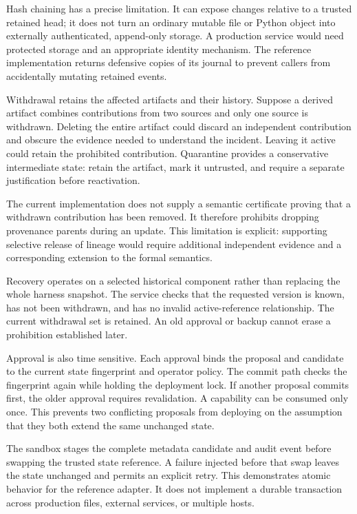 \IfFileExists{IEEEcsmag.cls}{\publishertrue\documentclass{IEEEcsmag}}{\publisherfalse\documentclass[11pt]{article}}
\begin{document}
Hash chaining has a precise limitation. It can expose changes relative to a trusted retained head; it does not turn an ordinary mutable file or Python object into externally authenticated, append-only storage. A production service would need protected storage and an appropriate identity mechanism. The reference implementation returns defensive copies of its journal to prevent callers from accidentally mutating retained events.

Withdrawal retains the affected artifacts and their history. Suppose a derived artifact combines contributions from two sources and only one source is withdrawn. Deleting the entire artifact could discard an independent contribution and obscure the evidence needed to understand the incident. Leaving it active could retain the prohibited contribution. Quarantine provides a conservative intermediate state: retain the artifact, mark it untrusted, and require a separate justification before reactivation.

The current implementation does not supply a semantic certificate proving that a withdrawn contribution has been removed. It therefore prohibits dropping provenance parents during an update. This limitation is explicit: supporting selective release of lineage would require additional independent evidence and a corresponding extension to the formal semantics.

Recovery operates on a selected historical component rather than replacing the whole harness snapshot. The service checks that the requested version is known, has not been withdrawn, and has no invalid active-reference relationship. The current withdrawal set is retained. An old approval or backup cannot erase a prohibition established later.

Approval is also time sensitive. Each approval binds the proposal and candidate to the current state fingerprint and operator policy. The commit path checks the fingerprint again while holding the deployment lock. If another proposal commits first, the older approval requires revalidation. A capability can be consumed only once. This prevents two conflicting proposals from deploying on the assumption that they both extend the same unchanged state.

The sandbox stages the complete metadata candidate and audit event before swapping the trusted state reference. A failure injected before that swap leaves the state unchanged and permits an explicit retry. This demonstrates atomic behavior for the reference adapter. It does not implement a durable transaction across production files, external services, or multiple hosts.
\end{document}
